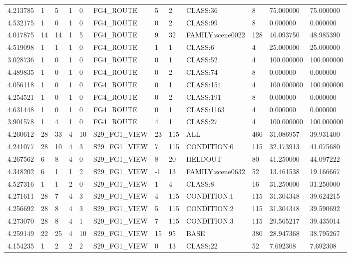 \begin{tabular}{llllllllllll}
4.213785 & 1 & 5 & 1 & 0 & FG4\_ROUTE & 5 & 2 & CLASS:36 & 8 & 75.000000 & 75.000000 \\
4.532175 & 1 & 0 & 1 & 0 & FG4\_ROUTE & 0 & 2 & CLASS:99 & 8 & 0.000000 & 0.000000 \\
4.017875 & 14 & 14 & 1 & 5 & FG4\_ROUTE & 9 & 32 & FAMILY:scene0022 & 128 & 46.093750 & 48.985390 \\
4.519098 & 1 & 1 & 1 & 0 & FG4\_ROUTE & 1 & 1 & CLASS:6 & 4 & 25.000000 & 25.000000 \\
3.028736 & 1 & 0 & 1 & 0 & FG4\_ROUTE & 0 & 1 & CLASS:52 & 4 & 100.000000 & 100.000000 \\
4.489835 & 1 & 0 & 1 & 0 & FG4\_ROUTE & 0 & 2 & CLASS:74 & 8 & 0.000000 & 0.000000 \\
4.056118 & 1 & 0 & 1 & 0 & FG4\_ROUTE & 0 & 1 & CLASS:154 & 4 & 100.000000 & 100.000000 \\
4.254521 & 1 & 0 & 1 & 0 & FG4\_ROUTE & 0 & 2 & CLASS:191 & 8 & 0.000000 & 0.000000 \\
4.631448 & 1 & 0 & 1 & 0 & FG4\_ROUTE & 0 & 1 & CLASS:1163 & 4 & 0.000000 & 0.000000 \\
3.901578 & 1 & 4 & 1 & 0 & FG4\_ROUTE & 4 & 1 & CLASS:27 & 4 & 100.000000 & 100.000000 \\
4.260612 & 28 & 33 & 4 & 10 & S29\_FG1\_VIEW & 23 & 115 & ALL & 460 & 31.086957 & 39.931400 \\
4.241077 & 28 & 10 & 4 & 3 & S29\_FG1\_VIEW & 7 & 115 & CONDITION:0 & 115 & 32.173913 & 41.075680 \\
4.267562 & 6 & 8 & 4 & 0 & S29\_FG1\_VIEW & 8 & 20 & HELDOUT & 80 & 41.250000 & 44.097222 \\
4.348202 & 6 & 1 & 1 & 2 & S29\_FG1\_VIEW & -1 & 13 & FAMILY:scene0632 & 52 & 13.461538 & 19.166667 \\
4.527316 & 1 & 1 & 2 & 0 & S29\_FG1\_VIEW & 1 & 4 & CLASS:8 & 16 & 31.250000 & 31.250000 \\
4.271611 & 28 & 7 & 4 & 3 & S29\_FG1\_VIEW & 4 & 115 & CONDITION:1 & 115 & 31.304348 & 39.624215 \\
4.256692 & 28 & 8 & 4 & 3 & S29\_FG1\_VIEW & 5 & 115 & CONDITION:2 & 115 & 31.304348 & 39.590692 \\
4.273070 & 28 & 8 & 4 & 1 & S29\_FG1\_VIEW & 7 & 115 & CONDITION:3 & 115 & 29.565217 & 39.435014 \\
4.259149 & 22 & 25 & 4 & 10 & S29\_FG1\_VIEW & 15 & 95 & BASE & 380 & 28.947368 & 38.795267 \\
4.154235 & 1 & 2 & 2 & 2 & S29\_FG1\_VIEW & 0 & 13 & CLASS:22 & 52 & 7.692308 & 7.692308 \\

\end{tabular}
